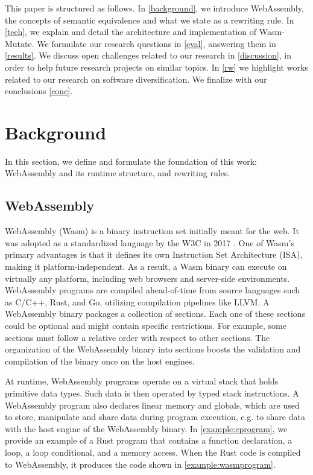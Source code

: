 \documentclass[a4paper,fleqn]{cas-dc}
\newcommand{\tool}{{\sc Wasm-Mutate}\xspace}
\newcommand{\Wasm}{WebAssembly\xspace}
\begin{document}
This paper is structured as follows. 
In \autoref{background}, we introduce WebAssembly, the concepts of semantic equivalence and what we state as a rewriting rule.
In \autoref{tech}, we explain and detail the architecture and implementation of \tool.
We formulate our research questions in \autoref{eval}, answering them in \autoref{results}.
We discuss open challenges related to our research in \autoref{discussion}, in order to help future research projects on similar topics.
In \autoref{rw} we highlight works related to our research on software diversification.
We finalize with our conclusions \autoref{conc}.

\section{Background}
\label{background}

In this section, we define and formulate the foundation of this work: WebAssembly and its runtime structure, and rewriting rules.

\subsection{WebAssembly}

WebAssembly (Wasm) is a binary instruction set initially  meant for the web. 
It was adopted as a standardized language by the W3C in 2017 \cite{haas2017bringing}. One of Wasm's primary advantages is that it defines its own Instruction Set Architecture (ISA), making it platform-independent. 
As a result, a Wasm binary can execute on virtually any platform, including web browsers and server-side environments. 
WebAssembly programs are compiled ahead-of-time from source languages such as C/C++, Rust, and Go, utilizing compilation pipelines like LLVM. 
A \Wasm binary packages a collection of sections.
Each one of these sections could be optional and might contain specific restrictions.
For example, some sections must follow a relative order with respect to other sections.
The organization of the \Wasm binary into sections boosts the validation and compilation of the binary once on the host engines.


At runtime, WebAssembly programs operate on a virtual stack that holds primitive data types.
Such data is then operated by typed stack instructions.
A WebAssembly program also declares linear memory and globals, which are used to store, manipulate and share data during program execution, e.g. to share data with the host engine of the WebAssembly binary.
In \autoref{example:cprogram}, we provide an example of a Rust program that contains a function declaration, a loop, a loop conditional, and a memory access. When the Rust code is compiled to WebAssembly, it produces the code shown in \autoref{example:wasmprogram}. 
\end{document}
